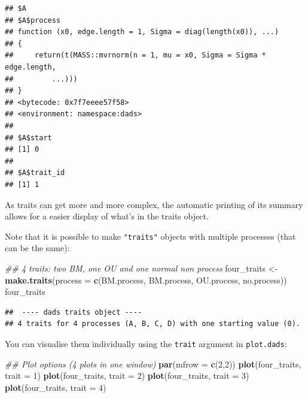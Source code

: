 \documentclass[]{book}
\newenvironment{Shaded}{\begin{snugshade}}{\end{snugshade}}
\newcommand{\CommentTok}[1]{\textcolor[rgb]{0.56,0.35,0.01}{\textit{#1}}}
\newcommand{\DataTypeTok}[1]{\textcolor[rgb]{0.13,0.29,0.53}{#1}}
\newcommand{\DecValTok}[1]{\textcolor[rgb]{0.00,0.00,0.81}{#1}}
\newcommand{\KeywordTok}[1]{\textcolor[rgb]{0.13,0.29,0.53}{\textbf{#1}}}
\newcommand{\NormalTok}[1]{#1}
\newcommand{\StringTok}[1]{\textcolor[rgb]{0.31,0.60,0.02}{#1}}
\begin{document}
\begin{verbatim}
## $A
## $A$process
## function (x0, edge.length = 1, Sigma = diag(length(x0)), ...) 
## {
##     return(t(MASS::mvrnorm(n = 1, mu = x0, Sigma = Sigma * edge.length, 
##         ...)))
## }
## <bytecode: 0x7f7eeee57f58>
## <environment: namespace:dads>
## 
## $A$start
## [1] 0
## 
## $A$trait_id
## [1] 1
\end{verbatim}

As traits can get more and more complex, the automatic printing of its summary allows for a easier display of what's in the traits object.

Note that it is possible to make \texttt{"traits"} objects with multiple processes (that can be the same):

\begin{Shaded}
\begin{Highlighting}[]
\CommentTok{## 4 traits: two BM, one OU and one normal non process}
\NormalTok{four_traits <-}\StringTok{ }\KeywordTok{make.traits}\NormalTok{(}\DataTypeTok{process =} \KeywordTok{c}\NormalTok{(BM.process,}
\NormalTok{                                       BM.process,}
\NormalTok{                                       OU.process,}
\NormalTok{                                       no.process))}
\NormalTok{four_traits}
\end{Highlighting}
\end{Shaded}

\begin{verbatim}
##  ---- dads traits object ---- 
## 4 traits for 4 processes (A, B, C, D) with one starting value (0).
\end{verbatim}

You can visualise them individually using the \texttt{trait} argument in \texttt{plot.dads}:

\begin{Shaded}
\begin{Highlighting}[]
\CommentTok{## Plot options (4 plots in one window)}
\KeywordTok{par}\NormalTok{(}\DataTypeTok{mfrow =} \KeywordTok{c}\NormalTok{(}\DecValTok{2}\NormalTok{,}\DecValTok{2}\NormalTok{))}
\KeywordTok{plot}\NormalTok{(four_traits, }\DataTypeTok{trait =} \DecValTok{1}\NormalTok{)}
\KeywordTok{plot}\NormalTok{(four_traits, }\DataTypeTok{trait =} \DecValTok{2}\NormalTok{)}
\KeywordTok{plot}\NormalTok{(four_traits, }\DataTypeTok{trait =} \DecValTok{3}\NormalTok{)}
\KeywordTok{plot}\NormalTok{(four_traits, }\DataTypeTok{trait =} \DecValTok{4}\NormalTok{)}
\end{Highlighting}
\end{Shaded}
\end{document}
